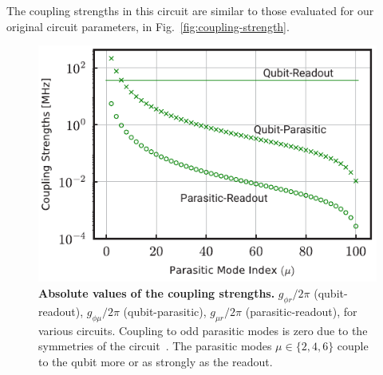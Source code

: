\documentclass[%
reprint,
superscriptaddress,
 amsmath,amssymb,
 aps,
 prx,
longbibliography,
floatfix,
]{revtex4-2}
\begin{document}
The coupling strengths in this circuit are similar to those evaluated for our original circuit parameters, in Fig.~\ref{fig:coupling-strength}.
\begin{figure}[htb]
    \centering
    \includegraphics[width=\linewidth]{Supp_Fig/Coupling-Will.pdf}
    \caption{{\bf Absolute values of the coupling strengths.} $g_{\phi r}/2\pi$ (qubit-readout), $g_{\phi\mu}/2\pi$ (qubit-parasitic), $g_{\mu r}/2\pi$ (parasitic-readout), for various circuits. Coupling to odd parasitic modes is zero due to the symmetries of the circuit~\cite{viola2015collective}. The parasitic modes $\mu\in\{2,4,6\}$ couple to the qubit more or as strongly as the readout.}
    \label{fig:coupling-strength-Will}
\end{figure}
\end{document}
